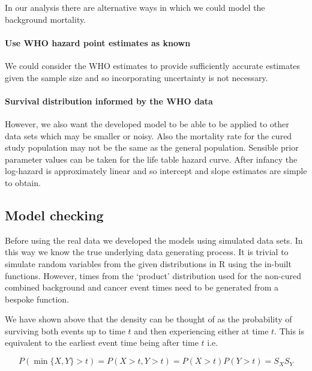 \documentclass[
]{article}
\begin{document}
In our analysis there are alternative ways in which we could model the
background mortality.

\hypertarget{use-who-hazard-point-estimates-as-known}{%
\paragraph{Use WHO hazard point estimates as
known}\label{use-who-hazard-point-estimates-as-known}}

We could consider the WHO estimates to provide sufficiently accurate
estimates given the sample size and so incorporating uncertainty is not
necessary.

\hypertarget{survival-distribution-informed-by-the-who-data}{%
\paragraph{Survival distribution informed by the WHO
data}\label{survival-distribution-informed-by-the-who-data}}

However, we also want the developed model to be able to be applied to
other data sets which may be smaller or noisy. Also the mortality rate
for the cured study population may not be the same as the general
population. Sensible prior parameter values can be taken for the life
table hazard curve. After infancy the log-hazard is approximately linear
and so intercept and slope estimates are simple to obtain.

\hypertarget{model-checking}{%
\subsection{Model checking}\label{model-checking}}

Before using the real data we developed the models using simulated data
sets. In this way we know the true underlying data generating process.
It is trivial to simulate random variables from the given distributions
in R using the in-built functions. However, times from the `product'
distribution used for the non-cured combined background and cancer event
times need to be generated from a bespoke function.

We have shown above that the density can be thought of as the
probability of surviving both events up to time \(t\) and then
experiencing either at time \(t\). This is equivalent to the earliest
event time being after time \(t\) i.e.

\[
P(\min\{ X,Y \}>t) = P(X>t, Y>t) = P(X>t) P(Y>t) = S_X S_Y
\]
\end{document}
